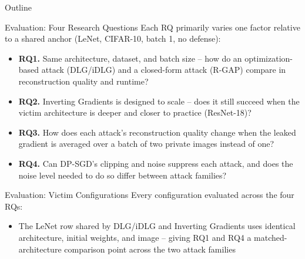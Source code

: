 \documentclass[aspectratio=169,xcolor=dvipsnames]{beamer}
\begin{document}
\begin{frame}{Outline}
\tableofcontents[currentsection]
\end{frame}


\begin{frame}{Evaluation: Four Research Questions}
Each RQ primarily varies one factor relative to a shared anchor (LeNet, CIFAR-10, batch
1, no defense):
\begin{itemize}
\item \textbf{RQ1.} Same architecture, dataset, and batch size -- how do an
optimization-based attack (DLG/iDLG) and a closed-form attack (R-GAP) compare in
reconstruction quality and runtime?
\medskip
\item \textbf{RQ2.} Inverting Gradients is designed to scale -- does it still succeed
when the victim architecture is deeper and closer to practice (ResNet-18)?
\medskip
\item \textbf{RQ3.} How does each attack's reconstruction quality change when the
leaked gradient is averaged over a batch of two private images instead of one?
\medskip
\item \textbf{RQ4.} Can DP-SGD's clipping and noise suppress each attack, and does the
noise level needed to do so differ between attack families?
\end{itemize}
\end{frame}


\begin{frame}{Evaluation: Victim Configurations}
Every configuration evaluated across the four RQs:
\medskip
{}
\bigskip
\begin{itemize}
\item The LeNet row shared by DLG/iDLG and Inverting Gradients uses identical
architecture, initial weights, and image -- giving RQ1 and RQ4 a matched-architecture
comparison point across the two attack families
\end{itemize}
\end{frame}
\end{document}
